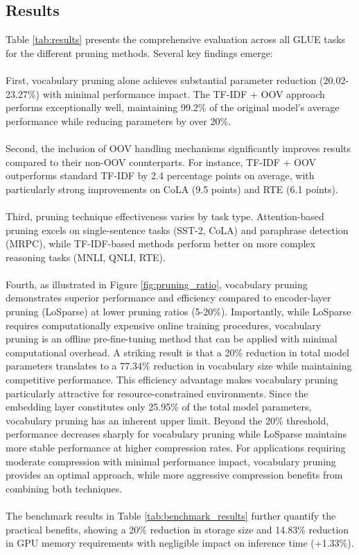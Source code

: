 \documentclass[twocolumn]{article}
\begin{document}
\subsection{Results}
Table \ref{tab:results} presents the comprehensive evaluation across all GLUE tasks for the different pruning methods. Several key findings emerge:
\\ \\
First, vocabulary pruning alone achieves substantial parameter reduction (20.02-23.27\%) with minimal performance impact. The TF-IDF + OOV approach performs exceptionally well, maintaining 99.2\% of the original model's average performance while reducing parameters by over 20\%.
\\ \\
Second, the inclusion of OOV handling mechanisms significantly improves results compared to their non-OOV counterparts. For instance, TF-IDF + OOV outperforms standard TF-IDF by 2.4 percentage points on average, with particularly strong improvements on CoLA (9.5 points) and RTE (6.1 points).
\\ \\
Third, pruning technique effectiveness varies by task type. Attention-based pruning excels on single-sentence tasks (SST-2, CoLA) and paraphrase detection (MRPC), while TF-IDF-based methods perform better on more complex reasoning tasks (MNLI, QNLI, RTE).
\\ \\
Fourth, as illustrated in Figure \ref{fig:pruning_ratio}, vocabulary pruning demonstrates superior performance and efficiency compared to encoder-layer pruning (LoSparse) at lower pruning ratios (5-20\%). Importantly, while LoSparse requires computationally expensive online training procedures, vocabulary pruning is an offline pre-fine-tuning method that can be applied with minimal computational overhead. A striking result is that a 20\% reduction in total model parameters translates to a 77.34\% reduction in vocabulary size while maintaining competitive performance. This efficiency advantage makes vocabulary pruning particularly attractive for resource-constrained environments. Since the embedding layer constitutes only 25.95\% of the total model parameters, vocabulary pruning has an inherent upper limit. Beyond the 20\% threshold, performance decreases sharply for vocabulary pruning while LoSparse maintains more stable performance at higher compression rates. For applications requiring moderate compression with minimal performance impact, vocabulary pruning provides an optimal approach, while more aggressive compression benefits from combining both techniques.
\\ \\
The benchmark results in Table \ref{tab:benchmark_results} further quantify the practical benefits, showing a 20\% reduction in storage size and 14.83\% reduction in GPU memory requirements with negligible impact on inference time (+1.33\%).
\end{document}
